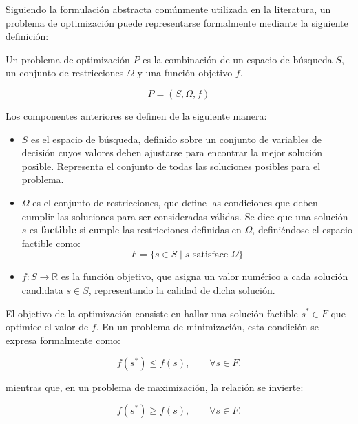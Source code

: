 Siguiendo la formulación abstracta comúnmente utilizada en la literatura, un problema de optimización puede representarse formalmente mediante la siguiente definición:

\begin{definicion}
    Un problema de optimización \(P\) es la combinación de un espacio de búsqueda \(S\), un conjunto de restricciones \(\Omega\) y una función objetivo \(f\).

    \begin{equation}
        P = (S, \Omega, f)
    \end{equation}
\end{definicion}

Los componentes anteriores se definen de la siguiente manera:

\begin{itemize}
    \item \(S\) es el espacio de búsqueda, definido sobre un conjunto de variables de decisión cuyos valores deben ajustarse para encontrar la mejor solución posible. Representa el conjunto de todas las soluciones posibles para el problema.
    \item \(\Omega\) es el conjunto de restricciones, que define las condiciones que deben cumplir las soluciones para ser consideradas válidas. Se dice que una solución \(s\) es \textbf{factible} si cumple las restricciones definidas en \(\Omega\), definiéndose el espacio factible como:
          \begin{equation}
              F = \{ s \in S \mid s \text{ satisface } \Omega \}
          \end{equation}
    \item \(f: S \rightarrow \mathbb{R}\) es la función objetivo, que asigna un valor numérico a cada solución candidata \(s \in S\), representando la calidad de dicha solución.
\end{itemize}

El objetivo de la optimización consiste en hallar una solución factible \(s^* \in F\) que optimice el valor de \(f\). En un problema de minimización, esta condición se expresa formalmente como:

\begin{equation}
    f(s^*) \leq f(s), \qquad \forall s \in F.
\end{equation}

\noindent mientras que, en un problema de maximización, la relación se invierte:

\begin{equation}
    f(s^*) \geq f(s), \qquad \forall s \in F.
\end{equation}

